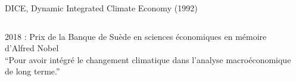 \documentclass{beamer}
\begin{document}
\begin{frame}{DICE, Dynamic Integrated Climate Economy (1992)}
\begin{columns}
  \begin{column}{0.7\textwidth}
  
  2018 : Prix de la Banque de Suède en sciences économiques en mémoire d'Alfred Nobel \\
  \vspace{0,5cm}
  ``Pour avoir intégré le changement climatique dans l'analyse macroéconomique de long terme.''
\end{column}

\begin{column}{0.3\textwidth}

\end{column}
\end{columns}

\end{frame}
\end{document}
